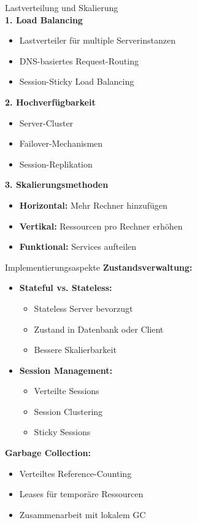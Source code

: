 \begin{KR}{Lastverteilung und Skalierung}\\
\textbf{1. Load Balancing}
\begin{itemize}
    \item Lastverteiler für multiple Serverinstanzen
    \item DNS-basiertes Request-Routing
    \item Session-Sticky Load Balancing
\end{itemize}

\textbf{2. Hochverfügbarkeit}
\begin{itemize}
    \item Server-Cluster
    \item Failover-Mechanismen
    \item Session-Replikation
\end{itemize}

\textbf{3. Skalierungsmethoden}
\begin{itemize}
    \item \textbf{Horizontal:} Mehr Rechner hinzufügen
    \item \textbf{Vertikal:} Ressourcen pro Rechner erhöhen
    \item \textbf{Funktional:} Services aufteilen
\end{itemize}
\end{KR}

\begin{example2}{Implementierungsaspekte}
\textbf{Zustandsverwaltung:}
\begin{itemize}
    \item \textbf{Stateful vs. Stateless:}
    \begin{itemize}
        \item Stateless Server bevorzugt
        \item Zustand in Datenbank oder Client
        \item Bessere Skalierbarkeit
    \end{itemize}
    
    \item \textbf{Session Management:}
    \begin{itemize}
        \item Verteilte Sessions
        \item Session Clustering
        \item Sticky Sessions
    \end{itemize}
\end{itemize}

\textbf{Garbage Collection:}
\begin{itemize}
    \item Verteiltes Reference-Counting
    \item Leases für temporäre Ressourcen
    \item Zusammenarbeit mit lokalem GC
\end{itemize}
\end{example2}

